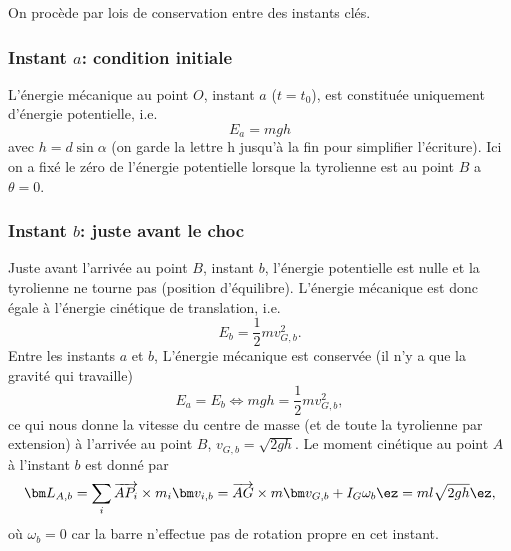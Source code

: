 \par\vspace{2mm}
On procède par lois de conservation entre des instants clés.
\subsubsection*{Instant $a$: condition initiale}
L'énergie mécanique au point $O$, instant $a$ ($t=t_0$), est constituée uniquement d'énergie potentielle, i.e.
\begin{equation}
    E_{a} =mgh
\end{equation}
avec $h=d\sin\alpha$ (on garde la lettre h jusqu'à la fin pour simplifier l'écriture). 
Ici on a fixé le zéro de l'énergie potentielle lorsque la tyrolienne est au point $B$ a $\theta=0$.

\subsubsection*{Instant $b$: juste avant le choc}
Juste avant l'arrivée au point $B$, instant $b$, l'énergie potentielle est nulle et la tyrolienne ne tourne pas (position d'équilibre).
L'énergie mécanique est donc égale à l'énergie cinétique de translation, i.e.
\begin{equation}
    E_{b} = \frac{1}{2}mv_{G,b}^2.
\end{equation}
Entre les instants $a$ et $b$, L'énergie mécanique est conservée (il n'y a que la gravité qui travaille)
\begin{equation}
    E_{a} = E_{b} \Leftrightarrow mgh = \frac{1}{2}mv_{G,b}^2,
\end{equation}
ce qui nous donne la vitesse du centre de masse (et de toute la tyrolienne par extension) à l'arrivée au point $B$, $v_{G,b}=\sqrt{2gh}$.
Le moment cinétique au point $A$ à l'instant $b$ est donné par 
\begin{equation}
    \bm L_{A,b} =\sum_i\overrightarrow{AP_i}\times m_i \bm v_{i,b} = \overrightarrow{AG}\times m \bm v_{G,b} + I_G \omega_b \ez = ml\sqrt{2gh}\ez,
\end{equation}
où $\omega_b=0$ car la barre n'effectue pas de rotation propre en cet instant.

